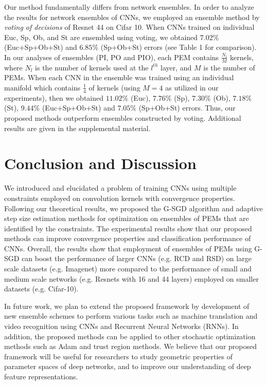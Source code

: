 \documentclass[10pt,journal,compsoc]{IEEEtran}
\theoremstyle{definition}
\theoremstyle{definition}
\theoremstyle{remark}
\theoremstyle{remark}
\theoremstyle{remark}
\begin{document}
Our method fundamentally differs from network ensembles. In order to analyze the results for network ensembles of CNNs, we employed an ensemble method \cite{res_net} by \textit{voting of decisions} of Resnet 44 on Cifar 10. When CNNs trained on individual Euc, Sp, Ob, and St are ensembled using voting, we obtained $7.02\%$  (Euc+Sp+Ob+St) and $6.85\%$ (Sp+Ob+St) errors (see Table 1 for comparison). In our analyses of ensembles (PI, PO and PIO), each PEM contains $\frac{N_l}{M}$ kernels, where $N_l$ is the number of kernels used at the $l^{th}$ layer, and $M$ is the number of PEMs. When each CNN in the ensemble was trained using an individual manifold which contains $\frac{1}{4}$ of kernels (using $M=4$ as utilized in our experiments), then we obtained $11.02\%$ (Euc), $7.76\%$ (Sp), $7.30\%$ (Ob), $7.18\%$ (St), $9.44\%$ (Euc+Sp+Ob+St) and $7.05\%$ (Sp+Ob+St) errors. Thus, our proposed methods outperform ensembles constructed by voting. Additional results are given in the supplemental material.

\section{Conclusion and Discussion}
\label{sec:conc}

We introduced and elucidated a problem of training CNNs using multiple constraints  employed on  convolution kernels with convergence properties. Following our theoretical results, we proposed the G-SGD algorithm and adaptive step size estimation methods for optimization on ensembles of PEMs that are identified by the constraints. The experimental results show that our proposed  methods can improve   convergence properties and classification performance of CNNs. Overall, the results show that employment of ensembles of PEMs using G-SGD can boost the performance of larger CNNs (e.g. RCD and RSD) on large scale datasets (e.g. Imagenet) more compared to the performance of small and medium scale networks (e.g. Resnets with 16 and 44 layers) employed on smaller datasets (e.g. Cifar-10). 

In future work, we plan to extend the proposed framework by development of new ensemble schemes to perform various tasks such as machine translation and video recognition using CNNs and Recurrent Neural Networks (RNNs). In addition, the proposed methods can be applied to other stochastic optimization methods such as Adam and trust region methods. We believe that our proposed framework will be useful for researchers to study geometric properties of parameter spaces of deep networks, and to improve our understanding of deep feature representations.







\end{document}
